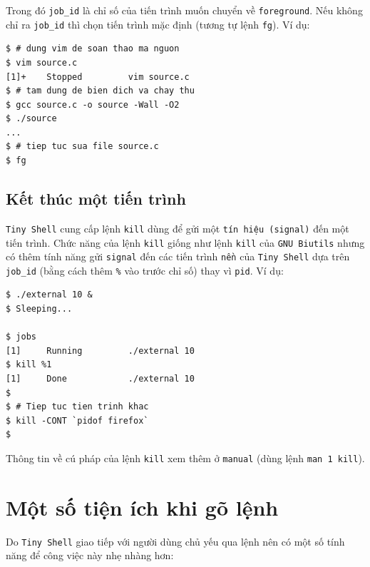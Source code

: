 \documentclass[a4paper,12pt]{report}
\begin{document}
	    Trong đó \texttt{job\_id} là chỉ số của tiến trình muốn chuyển về
	    \texttt{foreground}. Nếu không chỉ ra \texttt{job\_id} thì chọn
	    tiến trình mặc định (tương tự lệnh \texttt{fg}). Ví dụ:
	    \begin{verbatim}
$ # dung vim de soan thao ma nguon
$ vim source.c
[1]+    Stopped         vim source.c
$ # tam dung de bien dich va chay thu
$ gcc source.c -o source -Wall -O2
$ ./source
...
$ # tiep tuc sua file source.c
$ fg
	    \end{verbatim}

        \subsection{Kết thúc một tiến trình}
            \texttt{Tiny Shell} cung cấp lệnh \texttt{kill} dùng để gửi một
            \texttt{tín hiệu (signal)} đến một tiến trình. Chức năng của lệnh
            \texttt{kill} giống như lệnh \texttt{kill} của \texttt{GNU Biutils}
            nhưng có thêm tính năng gửi \texttt{signal} đến các tiến trình
            \texttt{nền} của \texttt{Tiny Shell} dựa trên \texttt{job\_id}
            (bằng cách thêm \texttt{\%} vào trước chỉ số) thay
            vì \texttt{pid}. Ví dụ:
            \begin{verbatim}
$ ./external 10 &
$ Sleeping...

$ jobs
[1]     Running         ./external 10 
$ kill %1
[1]     Done            ./external 10 
$ 
$ # Tiep tuc tien trinh khac
$ kill -CONT `pidof firefox`
$
            \end{verbatim}
            Thông tin về cú pháp của lệnh \texttt{kill} xem thêm ở
            \texttt{manual} (dùng lệnh \texttt{man 1 kill}).

    \section{Một số tiện ích khi gõ lệnh}
        Do \texttt{Tiny Shell} giao tiếp với người dùng chủ yếu qua lệnh nên có
        một số tính năng để công việc này nhẹ nhàng hơn:
\end{document}
